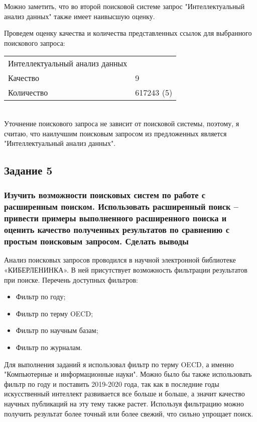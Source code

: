 \documentclass[14pt,a4paper,report]{report}
\begin{document}
Можно заметить, что во второй поисковой системе запрос "Интеллектуальный анализ данных" также имеет наивысшую оценку.

Проведем оценку качества и количества представленных ссылок для выбранного поискового запроса:\\

\begin{tabular}{ l l }
Интеллектуальный анализ данных \\
Качество & 9 \\
Количество & 617243 (5) \\
\end{tabular}\\

Уточнение поискового запроса не зависит от поисковой системы, поэтому, я считаю, что наилучшим поисковым запросом из предложенных является "Интеллектуальный анализ данных". 

\subsection{Задание 5}

\subsubsection{Изучить возможности поисковых систем по работе с расширенным поиском. Использовать расширенный поиск – привести примеры выполненного расширенного поиска и оценить качество полученных результатов по сравнению с простым поисковым запросом. Сделать выводы}

Анализ поисковых запросов проводился в научной электронной библиотеке «КИБЕРЛЕНИНКА». В ней присутствует возможность фильтрации результатов при поиске. Перечень доступных фильтров:
\begin{itemize}
	\item Фильтр по году;
	\item Фильтр по терму OECD;
	\item Фильтр по научным базам;
	\item Фильтр по журналам.
\end{itemize}

Для выполнения заданий я использовал фильтр по терму OECD, а именно "Компьютерные и информационные науки". Можно было бы также использовать фильтр по году и поставить 2019-2020 года, так как в последние годы искусственный интеллект развивается все больше и больше, а значит качество научных публикаций на эту тему также растет.
Используя фильтрацию можно получить результат более точный или более свежий, что сильно упрощает поиск.
\end{document}
